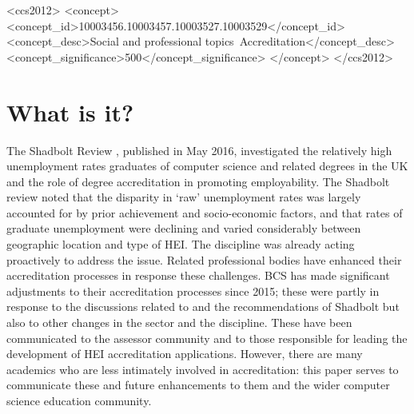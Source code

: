 \documentclass[sigconf]{acmart}
\begin{document}
\begin{CCSXML}
<ccs2012>
<concept>
<concept_id>10003456.10003457.10003527.10003529</concept_id>
<concept_desc>Social and professional topics~Accreditation</concept_desc>
<concept_significance>500</concept_significance>
</concept>
</ccs2012>
\end{CCSXML}




\maketitle
\section {What is it?}
The Shadbolt Review \cite{shadbolt2016shadbolt}, published in May
2016, investigated the relatively high unemployment rates graduates of
computer science and related degrees in the UK and the role of degree
accreditation in promoting employability. The Shadbolt review noted
that the disparity in `raw' unemployment rates was largely accounted
for by prior achievement and socio-economic factors, and that rates of
graduate unemployment were declining and varied considerably between
geographic location and type of HEI. The discipline was already acting
proactively to address the issue.  Related professional bodies have
enhanced their accreditation processes in response these
challenges. BCS has made significant adjustments to their
accreditation processes since 2015; these were partly in response to
the discussions related to and the recommendations of Shadbolt but
also to other changes in the sector and the discipline.  These have
been communicated to the assessor community and to those responsible
for leading the development of HEI accreditation
applications. However, there are many academics who are less
intimately involved in accreditation: this paper serves to communicate
these and future enhancements to them and the wider computer science
education community.
\end{document}
